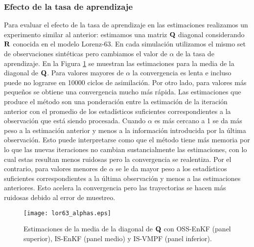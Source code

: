 \subsubsection{Efecto de la tasa de aprendizaje}
Para evaluar el efecto de la tasa de aprendizaje en las estimaciones realizamos un experimento similar al anterior: estimamos una matriz $\mathbf{Q}$ diagonal considerando $\mathbf{R}$ conocida en el modelo Lorenz-63. En cada simulación utilizamos el mismo set de observaciones sintéticas pero cambiamos el valor de $\alpha$ de la tasa de aprendizaje. En la Figura \ref{fig:lor63_alphas} se muestran las estimaciones para la media de la diagonal de $\mathbf{Q}$. Para valores mayores de $\alpha$ la convergencia es lenta e incluso puede no lograrse en 10000 ciclos de asimilación. Por otro lado, para valores más pequeños se obtiene una convergencia mucho más rápida. Las estimaciones que produce el método son una ponderación entre la estimación de la iteración anterior con el promedio de los estadísticos suficientes correspondientes a la observación que está siendo procesada. Cuando $\alpha$ es más cercano a 1 se da más peso a la estimación anterior y menos a la información introducida por la última observación. Esto puede interpretarse como que el método tiene más memoria por lo que las nuevas iteraciones no cambian sustancialmente las estimaciones, con lo cual estas resultan menos ruidosas pero la convergencia se realentiza. Por el contrario, para valores menores de $\alpha$ se le da mayor peso a los estadísticos suficientes correspondientes a la última observación y menos a las estimaciones anteriores. Esto acelera la convergencia pero las trayectorias se hacen más ruidosas debido al error de muestreo.
\begin{figure}[h]
    \centering
    \texttt{[image: lor63\_alphas.eps]}
    \caption{Estimaciones de la media de la diagonal de $\mathbf{Q}$ con OSS-EnKF (panel superior), IS-EnKF (panel medio) y IS-VMPF (panel inferior).}
    \label{fig:lor63_alphas}
\end{figure}


